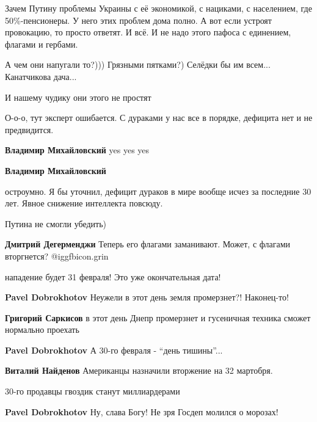 \begin{itemize}

Зачем Путину проблемы Украины с её экономикой, с нациками, с населением, где
50\%-пенсионеры. У него этих проблем дома полно. А вот если устроят
провокацию, то просто ответят. И всё. И не надо этого пафоса с единением, флагами
и гербами.


А чем они напугали то?))) Грязными пятками?) Селёдки бы им всем... Канатчикова дача...

И нашему чудику они этого не простят


О-о-о, тут эксперт ошибается. С дураками у нас все в порядке, дефицита нет и не
предвидится.

\begin{itemize} %
\textbf{Владимир Михайловский} yes yes yes

\textbf{Владимир Михайловский} 

остроумно. Я бы уточнил, дефицит дураков в мире вообще исчез за последние 30
лет. Явное снижение интеллекта повсюду.

\end{itemize} %

Путина не смогли убедить)

\textbf{Дмитрий Дегерменджи} Теперь его флагами заманивают. Может, с флагами вторгнется? @igg{fbicon.grin} 

нападение будет 31 февраля! Это уже окончательная дата!

\begin{itemize} %
\textbf{Pavel Dobrokhotov} Неужели в этот день земля промерзнет?! Наконец-то!

\textbf{Григорий Саркисов} в этот день Днепр промерзнет и гусеничная техника сможет нормально проехать

\textbf{Pavel Dobrokhotov}
А 30-го февраля - \enquote{день тишины}...

\textbf{Виталий Найденов} Американцы назначили вторжение на 32 мартобря.

30-го продавцы гвоздик станут миллиардерами

\textbf{Pavel Dobrokhotov} Ну, слава Богу! Не зря Госдеп молился о морозах!


\end{itemize}
\end{itemize}
